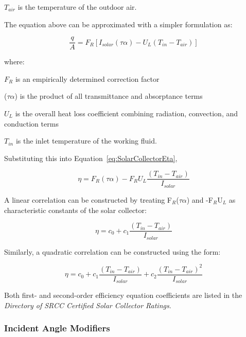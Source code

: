 \(T_{air}\) is the temperature of the outdoor air.

The equation above can be approximated with a simpler formulation as:

\begin{equation}
\frac{q}{A} = {F_R}\left[ {{I_{solar}}(\tau \alpha ) - {U_L}({T_{in}} - {T_{air}})} \right]
\label{eq:SolarCollectorqOverA697}
\end{equation}

where:

\(F_{R}\) is an empirically determined correction factor

(\(\tau \alpha\)) is the product of all transmittance and absorptance terms

\(U_{L}\) is the overall heat loss coefficient combining radiation, convection, and conduction terms

\(T_{in}\) is the inlet temperature of the working fluid.

Substituting this into Equation~\ref{eq:SolarCollectorEta},

\begin{equation}
\eta  = {F_R}(\tau \alpha ) - {F_R}{U_L}\frac{{({T_{in}} - {T_{air}})}}{{{I_{solar}}}}
\label{eq:SolarCollectorEta698}
\end{equation}

A linear correlation can be constructed by treating F\(_{R}\)(\(\tau \alpha\)) and -F\(_{R}\)U\(_{L}\) as characteristic constants of the solar collector:

\begin{equation}
\eta  = {c_0} + {c_1}\frac{{\left( {{T_{in}} - {T_{air}}} \right)}}{{{I_{solar}}}}
\end{equation}

Similarly, a quadratic correlation can be constructed using the form:

\begin{equation}
\eta  = {c_0} + {c_1}\frac{{\left( {{T_{in}} - {T_{air}}} \right)}}{{{I_{solar}}}} + {c_2}\frac{{{{\left( {{T_{in}} - {T_{air}}} \right)}^2}}}{{{I_{solar}}}}
\end{equation}

Both first- and second-order efficiency equation coefficients are listed in the \emph{Directory of SRCC Certified Solar Collector Ratings}.

\subsubsection{Incident Angle Modifiers}\label{incident-angle-modifiers}


